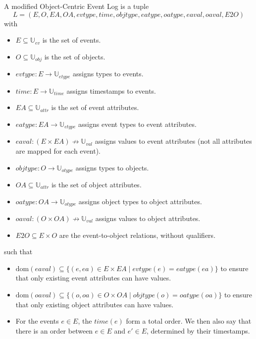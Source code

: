     
    \begin{definition}
        A modified Object-Centric Event Log is a tuple \[
    L = (E, O, EA, OA, evtype, \allowbreak time, objtype, \allowbreak eatype, oatype, eaval, \allowbreak oaval, E2O)
    \] with
    \begin{itemize}
        \item $E \subseteq \mathbb{U}_{ev}$ is the set of events.
        \item $O \subseteq \mathbb{U}_{obj}$ is the set of objects.
        \item $evtype : E \to \mathbb{U}_{etype}$ assigns types to events.
        \item $time: E \to \mathbb{U}_{time}$ assigns timestamps to events.
        \item $EA \subseteq \mathbb{U}_{attr}$ is the set of event attributes.
        \item $eatype : EA \to \mathbb{U}_{etype}$ assigns event types to event attributes.
        \item $eaval : (E \times EA) \not\to \mathbb{U}_{val}$ assigns values to event attributes (not all attributes are mapped for each event).
        \item $objtype : O \to \mathbb{U}_{otype}$ assigns types to objects.
        \item $OA \subseteq \mathbb{U}_{attr}$ is the set of object attributes.
        \item $oatype : OA \to \mathbb{U}_{otype}$ assigns object types to object attributes.
        \item $oaval : (O \times OA) \not\to \mathbb{U}_{val}$ assigns values to object attributes.
        \item $E2O \subseteq E \times O$ are the event-to-object relations, without qualifiers.
    \end{itemize}
    such that
    \begin{itemize}
        \item
        $\text{dom}(eaval) \subseteq \{(e, ea) \in E \times EA \mid evtype(e) = eatype(ea)\}$ to ensure that only existing event attributes can have values.
        
        \item
        $\text{dom}(oaval) \subseteq \{(o, oa) \in O \times OA\mid objtype(o) = oatype(oa)\}$ to ensure that only existing object attributes can have values.
    
        \item
        For the events $e \in E$, the $time(e)$ form a total order.
        We then also say that there is an order between $e \in E$ and $e' \in E$, determined by their timestamps.
    \end{itemize}
    \end{definition}
    

